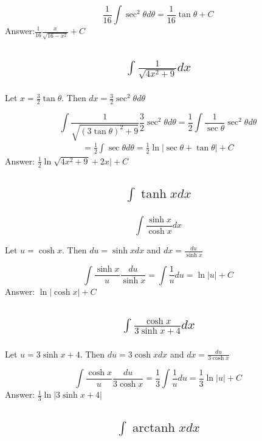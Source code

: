 \documentclass{article}
\DeclareMathOperator{\arctanh}{arctanh}
\begin{document}
\[\frac{1}{16} \int \sec^2{\theta} d\theta = \frac{1}{16} \tan{\theta} +C \]
Answer:$\frac{1}{16} \frac{x}{\sqrt{16-x^2}}+C$

\subsection{
	\begin{align*}
		\int{\frac{1}{\sqrt{4x^2 + 9}}dx}
	\end{align*}
}

Let $x= \frac{3}{2} \tan{\theta}$. Then $dx = \frac{3}{2} \sec^2{\theta}d\theta$

\[ \int \frac{1}{\sqrt{(3\tan{\theta})^2 +9}} \frac{3}{2} \sec^2{\theta} d\theta = \frac{1}{2} \int \frac{1}{\sec{\theta}} \sec^2{\theta} d\theta\]
\begin{align*}
	 = \frac{1}{2} \int{\sec{\theta}} d\theta = \frac{1}{2} \ln{|\sec{\theta} +\tan{\theta}|} +C
\end{align*}
Answer: $\frac{1}{2} \ln{\sqrt{4x^2+9}+2x|}+C$

\subsection{
	\begin{align*}
		\int{\tanh{x} dx}
	\end{align*}
}

\[\int \frac{\sinh{x}}{\cosh{x}}dx\]

Let $u = \cosh{x}$. Then $du = \sinh{x} dx$ and $dx = \frac{du}{\sinh{x}}$

\[ \int \frac{\sinh{x}}{u} \frac{du}{\sinh{x}} = \int \frac{1}{u} du = \ln{|u|} +C \]
Answer: $\ln{|\cosh{x}|} +C$

\subsection{
	\begin{align*}
		\int{\frac{\cosh{x}}{3\sinh{x} + 4} dx}
	\end{align*}
}

Let $u = 3 \sinh{x} +4$. Then $du = 3\cosh{x}dx$ and $dx = \frac{du}{3\cosh{x}}$

\[ \int \frac{\cosh{x}}{u} \frac{du}{3\cosh{x}} = \frac{1}{3} \int \frac{1}{u} du = \frac{1}{3} \ln{|u|} +C\]
Answer: $\frac{1}{3} \ln{|3 \sinh{x} +4|}$

\subsection{
	\begin{align*}
		\int{\arctanh{x} dx}
	\end{align*}
}
\end{document}
